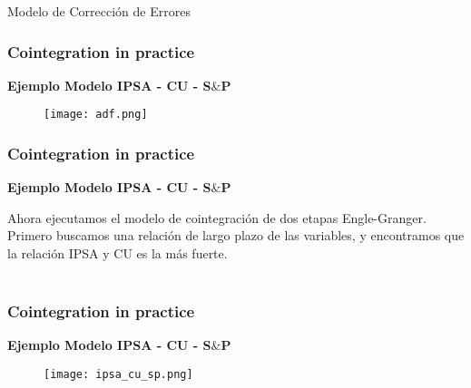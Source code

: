 \documentclass[spanish,xcolor=table]{beamer}
\begin{document}
\begin{section}{Modelo de Correcci\'on de Errores}
\begin{frame}
\frametitle{Cointegration in practice}
\textbf{Ejemplo Modelo IPSA - CU - S$\&$P}

\begin{figure}[t!]
\texttt{[image: adf.png]}
\end{figure}

\end{frame}

\begin{frame}
\frametitle{Cointegration in practice}
\textbf{Ejemplo Modelo IPSA - CU - S$\&$P}

Ahora ejecutamos el modelo de cointegraci\'on de dos etapas Engle-Granger. Primero buscamos una relaci\'on de largo plazo de las variables, y encontramos que la relaci\'on IPSA y CU es la m\'as fuerte. \\
\\

\end{frame}

\begin{frame}
\frametitle{Cointegration in practice}
\textbf{Ejemplo Modelo IPSA - CU - S$\&$P}

\begin{figure}[t!]
\texttt{[image: ipsa\_cu\_sp.png]}
\end{figure}


\end{frame}
\end{section}
\end{document}
